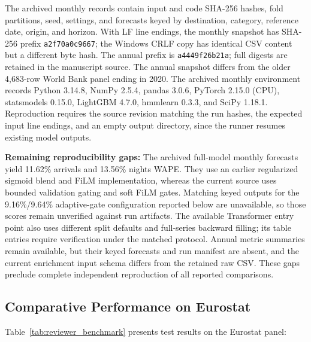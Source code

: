 \documentclass[sigconf]{acmart}
\begin{document}
The archived monthly records contain input and code SHA-256 hashes, fold partitions, seed, settings, and forecasts keyed by destination, category, reference date, origin, and horizon. With LF line endings, the monthly snapshot has SHA-256 prefix \texttt{a2f70a0c9667}; the Windows CRLF copy has identical CSV content but a different byte hash. The annual prefix is \texttt{a4449f26b21a}; full digests are retained in the manuscript source. The annual snapshot differs from the older 4,683-row World Bank panel ending in 2020. The archived monthly environment records Python 3.14.8, NumPy 2.5.4, pandas 3.0.6, PyTorch 2.15.0 (CPU), statsmodels 0.15.0, LightGBM 4.7.0, hmmlearn 0.3.3, and SciPy 1.18.1. Reproduction requires the source revision matching the run hashes, the expected input line endings, and an empty output directory, since the runner resumes existing model outputs.

\textbf{Remaining reproducibility gaps:} The archived full-model monthly forecasts yield 11.62\% arrivals and 13.56\% nights WAPE. They use an earlier regularized sigmoid blend and FiLM implementation, whereas the current source uses bounded validation gating and soft FiLM gates. Matching keyed outputs for the 9.16\%/9.64\% adaptive-gate configuration reported below are unavailable, so those scores remain unverified against run artifacts. The available Transformer entry point also uses different split defaults and full-series backward filling; its table entries require verification under the matched protocol. Annual metric summaries remain available, but their keyed forecasts and run manifest are absent, and the current enrichment input schema differs from the retained raw CSV. These gaps preclude complete independent reproduction of all reported comparisons.



\enlargethispage{20pt}
\subsection{Comparative Performance on Eurostat}
Table~\ref{tab:reviewer_benchmark} presents test results on the Eurostat panel:
\end{document}
